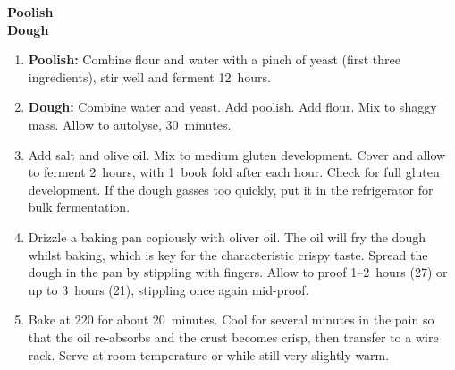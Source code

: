
\begin{ingredients}
  \textbf{Poolish}\\
  \textbf{Dough}\\
\end{ingredients}

\begin{recipe}
  \begin{enumerate}

  \item \textbf{Poolish:} Combine flour and water with a pinch of
    yeast (first three ingredients), stir well and ferment 12~hours.

  \item \textbf{Dough:} Combine water and yeast.  Add poolish.  Add
    flour.  Mix to shaggy mass.  Allow to autolyse, 30~minutes.

  \item Add salt and olive oil.  Mix to medium gluten development.
    Cover and allow to ferment 2\fracH~hours, with 1~book fold after
    each hour.  Check for full gluten development.  If the dough
    gasses too quickly, put it in the refrigerator for bulk fermentation.

  \item Drizzle a baking pan copiously with oliver oil.  The oil will
    fry the dough whilst baking, which is key for the characteristic
    crispy taste.  Spread the dough in the pan by stippling with
    fingers.  Allow to proof 1\fracH--2~hours (27\degreeC) or up to
    3~hours (21\degreeC), stippling once again mid-proof.

  \item Bake at 220\degreeC{} for about 20~minutes.  Cool for several
    minutes in the pain so that the oil re-absorbs and the crust
    becomes crisp, then transfer to a wire rack.  Serve at room
    temperature or while still very slightly warm.

  \end{enumerate}
\end{recipe}


